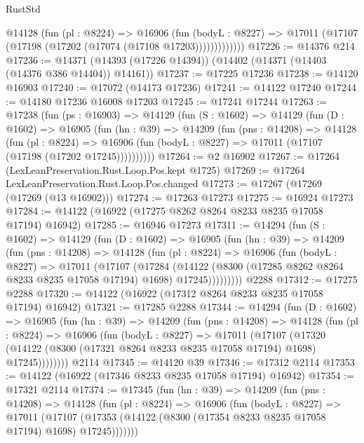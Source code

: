 \begin{lexlean}{RustStd}
\begin{coremodule}
              @14128
                (fun (pl : @8224) =>
                @16906
                  (fun (bodyL : @8227) =>
                  @17011 (@17107 (@17198 (@17202 (@17074 (@17108 @17203)))))))))))))
@17226 := @14376 @214
@17236 := @14371 (@14393 (@17226 @14394)) (@14402 (@14371 (@14403 (@14376 @386 @14404)) @14161))
@17237 := @17225 @17236
@17238 := @14120 @16903
@17240 := @17072 (@14173 @17236)
@17241 := @14122 @17240
@17244 := @14180 @17236 @16008 @17203
@17245 := @17241 @17244
@17263 := @17238
    (fun (ps : @16903) =>
    @14129
      (fun (S : @1602) =>
      @14129
        (fun (D : @1602) =>
        @16905
          (fun (hn : @39) =>
          @14209
            (fun (pns : @14208) =>
            @14128
              (fun (pl : @8224) =>
              @16906 (fun (bodyL : @8227) => @17011 (@17107 (@17198 (@17202 @17245))))))))))
@17264 := @2 @16902
@17267 := @17264 (LexLeanPreservation.Rust.Loop.Pos.kept @1725)
@17269 := @17264 LexLeanPreservation.Rust.Loop.Pos.changed
@17273 := @17267 (@17269 (@17269 (@13 @16902)))
@17274 := @17263 @17273
@17275 := @16924 @17273
@17284 := @14122 (@16922 (@17275 @8262 @8264 @8233 @8235 @17058 @17194) @16942)
@17285 := @16946 @17273
@17311 := @14294
    (fun (S : @1602) =>
    @14129
      (fun (D : @1602) =>
      @16905
        (fun (hn : @39) =>
        @14209
          (fun (pns : @14208) =>
          @14128
            (fun (pl : @8224) =>
            @16906
              (fun (bodyL : @8227) =>
              @17011
                (@17107
                  (@17284
                    (@14122
                      (@8300 (@17285 @8262 @8264 @8233 @8235 @17058 @17194) @1698)
                      @17245)))))))))
    @2288
@17312 := @17275 @2288
@17320 := @14122 (@16922 (@17312 @8264 @8233 @8235 @17058 @17194) @16942)
@17321 := @17285 @2288
@17344 := @14294
    (fun (D : @1602) =>
    @16905
      (fun (hn : @39) =>
      @14209
        (fun (pns : @14208) =>
        @14128
          (fun (pl : @8224) =>
          @16906
            (fun (bodyL : @8227) =>
            @17011
              (@17107
                (@17320
                  (@14122 (@8300 (@17321 @8264 @8233 @8235 @17058 @17194) @1698) @17245))))))))
    @2114
@17345 := @14120 @39
@17346 := @17312 @2114
@17353 := @14122 (@16922 (@17346 @8233 @8235 @17058 @17194) @16942)
@17354 := @17321 @2114
@17374 := @17345
    (fun (hn : @39) =>
    @14209
      (fun (pns : @14208) =>
      @14128
        (fun (pl : @8224) =>
        @16906
          (fun (bodyL : @8227) =>
          @17011
            (@17107 (@17353 (@14122 (@8300 (@17354 @8233 @8235 @17058 @17194) @1698) @17245)))))))

\end{coremodule}
\end{lexlean}
